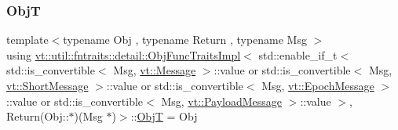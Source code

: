 \subsubsection{\texorpdfstring{ObjT}{ObjT}}
{\footnotesize\ttfamily template$<$typename Obj , typename Return , typename Msg $>$ \\
using \hyperlink{structvt_1_1util_1_1fntraits_1_1detail_1_1_obj_func_traits_impl}{vt\+::util\+::fntraits\+::detail\+::\+Obj\+Func\+Traits\+Impl}$<$ std\+::enable\+\_\+if\+\_\+t$<$ std\+::is\+\_\+convertible$<$ Msg, \hyperlink{namespacevt_a3a3ddfef40b4c90915fa43cdd5f129ea}{vt\+::\+Message} $>$\+::value or std\+::is\+\_\+convertible$<$ Msg, \hyperlink{namespacevt_a1125ac1da6c0bbf141e0ea0739d7602d}{vt\+::\+Short\+Message} $>$\+::value or std\+::is\+\_\+convertible$<$ Msg, \hyperlink{namespacevt_ad67368ffae52d7325002586b41bb150e}{vt\+::\+Epoch\+Message} $>$\+::value or std\+::is\+\_\+convertible$<$ Msg, \hyperlink{namespacevt_a89a92229c5622b855c02c549f83a1a68}{vt\+::\+Payload\+Message} $>$\+::value $>$, Return(Obj\+::$\ast$)(Msg $\ast$)$>$\+::\hyperlink{structvt_1_1util_1_1fntraits_1_1detail_1_1_obj_func_traits_impl_3_01std_1_1enable__if__t_3_01std50180eda0449a3437a18b4857773a769_ab9983bec45f1fd83ddfb425a7678428e}{ObjT} =  Obj}

